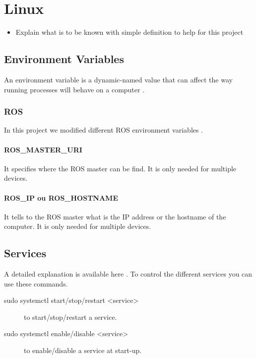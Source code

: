 \chapter{Linux}

{\color{red}
\begin{itemize}
    \item Explain what is to be known with simple definition to help for this project
\end{itemize}}

\section{Environment Variables}
An environment variable is a dynamic-named value that can affect the way running processes will behave on a computer \cite{wikipedia_env_var}.
\subsection{ROS}
In this project we modified different ROS environment variables \cite{ros_env_var}.
\subsubsection{ROS\_MASTER\_URI}
It specifies where the ROS master can be find.
It is only needed for multiple devices.

\subsubsection{ROS\_IP ou ROS\_HOSTNAME}
It tells to the ROS master what is the IP address or the hostname of the computer.
It is only needed for multiple devices.

\section{Services} \label{services}
A detailed explanation is available here \cite{techrepublic_services}.
To control the different services you can use these commands.
\begin{description}
    \item[sudo systemctl start/stop/restart <service>] to start/stop/restart a service.
    \item[sudo systemctl enable/disable <service>] to enable/disable a service at start-up.
\end{description}
